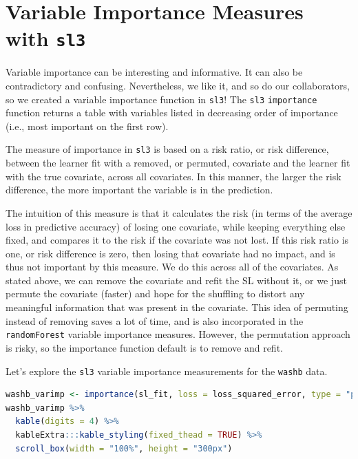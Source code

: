 \documentclass[
  12pt, krantz2,
]{krantz}
\newcommand{\passthrough}[1]{#1}
\newcommand{\1}{\mathbbm{1}}
\theoremstyle{definition}
\theoremstyle{definition}
\theoremstyle{definition}
\theoremstyle{definition}
\theoremstyle{remark}
\begin{document}
\hypertarget{variable-importance-measures-with-sl3}{%
\section*{\texorpdfstring{Variable Importance Measures with \texttt{sl3}}{Variable Importance Measures with sl3}}\label{variable-importance-measures-with-sl3}}


Variable importance can be interesting and informative. It can also be
contradictory and confusing. Nevertheless, we like it, and so do our
collaborators, so we created a variable importance function in \passthrough{\lstinline!sl3!}! The \passthrough{\lstinline!sl3!}
\passthrough{\lstinline!importance!} function returns a table with variables listed in decreasing order
of importance (i.e., most important on the first row).

The measure of importance in \passthrough{\lstinline!sl3!} is based on a risk ratio, or risk difference,
between the learner fit with a removed, or permuted, covariate and the learner
fit with the true covariate, across all covariates. In this manner, the larger
the risk difference, the more important the variable is in the prediction.

The intuition of this measure is that it calculates the risk (in terms of the
average loss in predictive accuracy) of losing one covariate, while keeping
everything else fixed, and compares it to the risk if the covariate was not
lost. If this risk ratio is one, or risk difference is zero, then losing that
covariate had no impact, and is thus not important by this measure. We do this
across all of the covariates. As stated above, we can remove the covariate and
refit the SL without it, or we just permute the covariate (faster)
and hope for the shuffling to distort any meaningful information that was
present in the covariate. This idea of permuting instead of removing saves a lot
of time, and is also incorporated in the \passthrough{\lstinline!randomForest!} variable importance
measures. However, the permutation approach is risky, so the importance function
default is to remove and refit.

Let's explore the \passthrough{\lstinline!sl3!} variable importance measurements for the \passthrough{\lstinline!washb!} data.

\begin{lstlisting}[language=R]
washb_varimp <- importance(sl_fit, loss = loss_squared_error, type = "permute")
washb_varimp %>%
  kable(digits = 4) %>%
  kableExtra:::kable_styling(fixed_thead = TRUE) %>%
  scroll_box(width = "100%", height = "300px")
\end{lstlisting}
\end{document}
